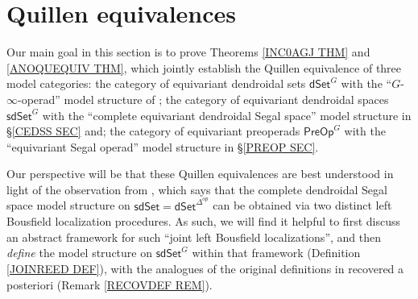 \documentclass[a4paper,10pt
 ,draft
]{article}%
\begin{document}



\section{Quillen equivalences}\label{QUIEQ SEC}


Our main goal in this section is to prove Theorems \ref{INC0AGJ THM} and \ref{ANOQUEQUIV THM},
which jointly establish the Quillen equivalence of three model categories:
the category of equivariant dendroidal sets $\mathsf{dSet}^G$
with the ``$G$-$\infty$-operad'' model structure of \cite[Thm. 2.1]{Per18};
the category of equivariant dendroidal spaces
$\mathsf{sdSet}^G$ with the
``complete equivariant dendroidal Segal space'' model structure in \S \ref{CEDSS SEC} and;
the category of equivariant preoperads $\mathsf{PreOp}^G$
with the ``equivariant Segal operad'' model structure in \S \ref{PREOP SEC}.

Our perspective will be that these Quillen equivalences are best understood in light of the observation from \cite[Thm. 6.6]{CM13a},
which says that the complete dendroidal Segal space model structure
on $\mathsf{sdSet} = \mathsf{dSet}^{\Delta^{op}}$ can be obtained via two distinct left Bousfield localization procedures.
%
%
As such, we will find it helpful to first discuss an abstract framework for 
such ``joint left Bousfield localizations'',
and then \textit{define} the model structure on 
$\mathsf{sdSet}^G$ within that framework
(Definition \ref{JOINREED DEF}),
with the analogues of the original definitions in
\cite{CM13a} recovered a posteriori (Remark \ref{RECOVDEF REM}).
\end{document}
